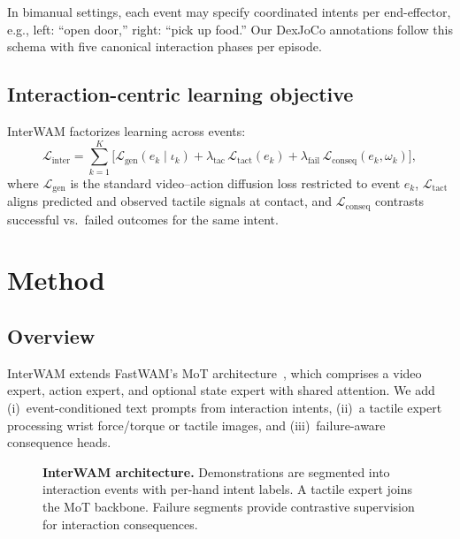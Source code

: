 \documentclass{article}
\begin{document}
In bimanual settings, each event may specify coordinated intents per end-effector, e.g., left: ``open door,'' right: ``pick up food.''
Our DexJoCo annotations follow this schema with five canonical interaction phases per episode.

\subsection{Interaction-centric learning objective}
InterWAM factorizes learning across events:
\begin{equation}
    \mathcal{L}_{\text{inter}} = \sum_{k=1}^{K} \Big[
        \mathcal{L}_{\text{gen}}(e_k \mid \iota_k)
        + \lambda_{\text{tac}} \, \mathcal{L}_{\text{tact}}(e_k)
        + \lambda_{\text{fail}} \, \mathcal{L}_{\text{conseq}}(e_k, \omega_k)
    \Big],
\end{equation}
where $\mathcal{L}_{\text{gen}}$ is the standard video--action diffusion loss restricted to event $e_k$,
$\mathcal{L}_{\text{tact}}$ aligns predicted and observed tactile signals at contact,
and $\mathcal{L}_{\text{conseq}}$ contrasts successful vs.\ failed outcomes for the same intent.

\section{Method}
\label{sec:method}

\subsection{Overview}
InterWAM extends FastWAM's MoT architecture~\citep{fastwam2026}, which comprises a video expert, action expert, and optional state expert with shared attention.
We add (i)~event-conditioned text prompts from interaction intents,
(ii)~a tactile expert processing wrist force/torque or tactile images, and
(iii)~failure-aware consequence heads.

\begin{figure}[t]
\begin{center}
\fbox{\rule[-.5cm]{0cm}{4cm} \rule[-.5cm]{6.5cm}{0cm}}
\end{center}
\caption{\textbf{InterWAM architecture.} Demonstrations are segmented into interaction events with per-hand intent labels. A tactile expert joins the MoT backbone. Failure segments provide contrastive supervision for interaction consequences.}
\label{fig:arch}
\end{figure}
\end{document}
